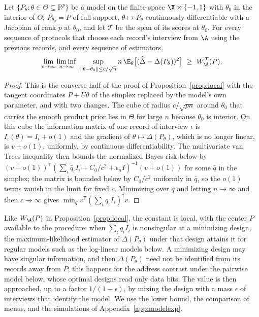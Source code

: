\begin{proposition}\label{prop:localmodel}
Let $\{P_\theta:\theta\in\Theta\subseteq\mathbb R^p\}$ be a model on the finite
space $\X\times\{-1,1\}$ with $\theta_0$ in the interior of $\Theta$,
$P_{\theta_0}=P$ of full support,
$\theta\mapsto P_\theta$ continuously differentiable with a Jacobian of rank
$p$ at $\theta_0$, and let $\mathcal T$ be the span of its scores at
$\theta_0$. For every sequence of protocols that choose each record's
interview from $\A$ using the previous records, and every sequence of
estimators,
\[
 \lim_{c\to\infty}\liminf_{n\to\infty}\ \sup_{\|\theta-\theta_0\|\le c/\sqrt n}
     n\,\E_\theta\big[(\widehat\Delta-\Delta(P_\theta))^2\big]\ \ge\ W^{\mathcal T}_\A(P).
\]
\end{proposition}
\begin{proof}
This is the converse half of the proof of Proposition~\ref{prop:local} with
the tangent coordinates $P+U\theta$ of the simplex replaced by the model's
own parameter, and with two changes. The cube of radius $c/\sqrt{pn}$ around
$\theta_0$ that carries the smooth product prior lies in $\Theta$ for large
$n$ because $\theta_0$ is interior. On this cube the information matrix of
one record of interview $\iota$ is $I_\iota(\theta)=I_\iota+o(1)$ and the
gradient of $\theta\mapsto\Delta(P_\theta)$, which is no longer linear, is
$v+o(1)$, uniformly, by continuous differentiability. The multivariate
van Trees inequality then bounds the normalized Bayes risk below by
$(v+o(1))^{\mathsf T}(\sum_\iota\bar q_\iota I_\iota+C_0/c^2+\epsilon_nI)^{-1}(v+o(1))$
for some $\bar q$ in the simplex; the matrix is bounded below by $C_0/c^2$
uniformly in $\bar q$, so the $o(1)$ terms vanish in the limit for fixed $c$.
Minimizing over $\bar q$ and letting $n\to\infty$ and then $c\to\infty$ gives
$\min_qv^{\mathsf T}(\sum_\iota q_\iota I_\iota)^\dagger v$.
\end{proof}
Like $W_\A(P)$ in Proposition~\ref{prop:local}, the constant is local, with
the center $P$ available to the procedure: when $\sum_\iota q_\iota I_\iota$
is nonsingular at a minimizing design, the maximum-likelihood estimator of
$\Delta(P_\theta)$ under that design attains it for regular models such as
the log-linear models below. A minimizing design may have singular
information, and then $\Delta(P_\theta)$ need not be identified from its
records away from $P$; this happens for the address contrast under the
pairwise model below, whose optimal designs read only data bits. The value
is then approached, up to a factor $1/(1-\epsilon)$, by mixing the design with
a mass $\epsilon$ of interviews that identify the model. We use the lower
bound, the comparison of menus, and the simulations of
Appendix~\ref{app:modelexp}.

